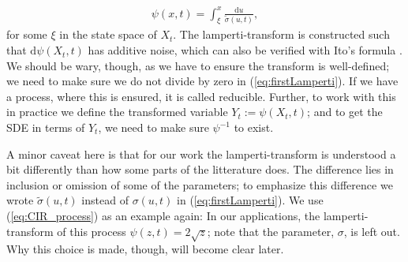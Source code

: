 \begin{align}
    \psi(x, t) = \int_{\xi}^x \frac{\mathrm{d}u}{\tilde{\sigma}(u, t)}, \label{eq:firstLamperti}
\end{align}
for some $\xi$ in the state space of $X_t$. The lamperti-transform is constructed such that $\mathrm{d}\psi(X_t, t)$ has additive noise, which can also be verified with Ito's formula \cite[equation (7.5)]{Srkk2019}. We should be wary, though, as we have to ensure the transform is well-defined; we need to make sure we do not divide by zero in (\ref{eq:firstLamperti}). If we have a process, where this is ensured, it is called reducible. Further, to work with this in practice we define the transformed variable $Y_t := \psi(X_t, t)$; and to get the SDE in terms of $Y_t$, we need to make sure $\psi^{-1}$ to exist.

A minor caveat here is that for our work the lamperti-transform is understood a bit differently than how some parts of the litterature does. The difference lies in inclusion or omission of some of the parameters; to emphasize this difference we wrote $\tilde{\sigma}(u, t)$ instead of $\sigma(u, t)$ in (\ref{eq:firstLamperti}). We use (\ref{eq:CIR_process}) as an example again: In our applications, the lamperti-transform of this process $\psi(z,t) = 2\sqrt{z}$; note that the parameter, $\sigma$, is left out. Why this choice is made, though, will become clear later.

